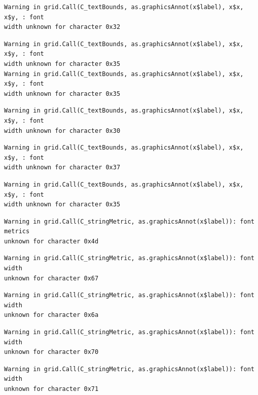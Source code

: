 \documentclass[
  letterpaper,
]{scrbook}
\begin{document}
\begin{verbatim}
Warning in grid.Call(C_textBounds, as.graphicsAnnot(x$label), x$x, x$y, : font
width unknown for character 0x32
\end{verbatim}

\begin{verbatim}
Warning in grid.Call(C_textBounds, as.graphicsAnnot(x$label), x$x, x$y, : font
width unknown for character 0x35
Warning in grid.Call(C_textBounds, as.graphicsAnnot(x$label), x$x, x$y, : font
width unknown for character 0x35
\end{verbatim}

\begin{verbatim}
Warning in grid.Call(C_textBounds, as.graphicsAnnot(x$label), x$x, x$y, : font
width unknown for character 0x30
\end{verbatim}

\begin{verbatim}
Warning in grid.Call(C_textBounds, as.graphicsAnnot(x$label), x$x, x$y, : font
width unknown for character 0x37
\end{verbatim}

\begin{verbatim}
Warning in grid.Call(C_textBounds, as.graphicsAnnot(x$label), x$x, x$y, : font
width unknown for character 0x35
\end{verbatim}

\begin{verbatim}
Warning in grid.Call(C_stringMetric, as.graphicsAnnot(x$label)): font metrics
unknown for character 0x4d
\end{verbatim}

\begin{verbatim}
Warning in grid.Call(C_stringMetric, as.graphicsAnnot(x$label)): font width
unknown for character 0x67
\end{verbatim}

\begin{verbatim}
Warning in grid.Call(C_stringMetric, as.graphicsAnnot(x$label)): font width
unknown for character 0x6a
\end{verbatim}

\begin{verbatim}
Warning in grid.Call(C_stringMetric, as.graphicsAnnot(x$label)): font width
unknown for character 0x70
\end{verbatim}

\begin{verbatim}
Warning in grid.Call(C_stringMetric, as.graphicsAnnot(x$label)): font width
unknown for character 0x71
\end{verbatim}
\end{document}
